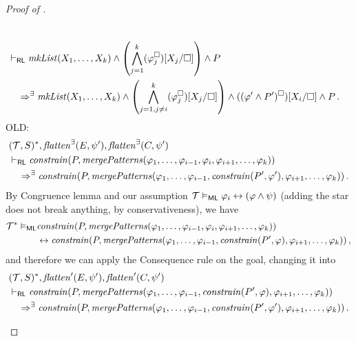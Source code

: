 \begin{proof}[Proof of ]
\begin{enumerate}
\begin{align*}
        \\& \vdash_{\mathsf{RL}}
        \mathit{mkList}(X_1, \ldots, X_k) \land \left( \bigwedge_{j=1}^{k} (\varphi_j^\square)[X_j/\square] \right) \land P
        \\&\quad \Rightarrow^\exists
        \mathit{mkList}(X_1, \ldots, X_k) \land \left( \bigwedge_{j=1, j \not = i}^{k} (\varphi_j^\square)[X_j/\square] \right) \land ((\varphi^\prime \land P^\prime)^\square)[X_i/\square] \land P
        \, .
    \end{align*}
    OLD:
    \begin{align*}
        & (\mathcal{T}, S)^*, \mathit{flatten}^\exists(E, \psi^\prime), \mathit{flatten}^\exists(C, \psi^\prime)
        \\& \vdash_{\mathsf{RL}}
        \mathit{constrain}(P, \mathit{mergePatterns}(\varphi_1, \ldots, \varphi_{i-1}, \varphi_i, \varphi_{i+1}, \ldots,                          \varphi_k))
        \\&\quad \Rightarrow^\exists
        \mathit{constrain}(P, \mathit{mergePatterns}(\varphi_1, \ldots, \varphi_{i-1}, \mathit{constrain}(P^\prime, \varphi^\prime), \varphi_{i+1}, \ldots, \varphi_k) ) \, .
    \end{align*}
    By Congruence lemma and our assumption $\mathcal{T} \vDash_{\mathsf{ML}} \varphi_i \leftrightarrow (\varphi \land \psi)$ (adding the star does not break anything, by conservativeness), we have
    \begin{align*}
        \mathcal{T}^* \vDash_{\mathsf{ML}} &
        \mathit{constrain}(P, \mathit{mergePatterns}(\varphi_1, \ldots, \varphi_{i-1}, \varphi_i, \varphi_{i+1}, \ldots,                          \varphi_k))
        \\ & \leftrightarrow
        \mathit{constrain}(P, \mathit{mergePatterns}(\varphi_1, \ldots, \varphi_{i-1}, \mathit{constrain}(P^\prime, \varphi), \varphi_{i+1}, \ldots, \varphi_k)) \, ,
    \end{align*}
    and therefore we can apply the Consequence rule on the goal, changing it into
    \begin{align*}
        & (\mathcal{T}, S)^*, \mathit{flatten}^\prime(E, \psi^\prime), \mathit{flatten}^\prime(C, \psi^\prime)
        \\& \vdash_\RL
        \mathit{constrain}(P, \mathit{mergePatterns}(\varphi_1, \ldots, \varphi_{i-1}, \mathit{constrain}(P^\prime, \varphi), \varphi_{i+1}, \ldots,                          \varphi_k))
        \\&\quad \Rightarrow^\exists
        \mathit{constrain}(P, \mathit{mergePatterns}(\varphi_1, \ldots, \varphi_{i-1}, \mathit{constrain}(P^\prime, \varphi^\prime), \varphi_{i+1}, \ldots, \varphi_k)) \, .

\end{align*}
\end{enumerate}
\end{proof}
